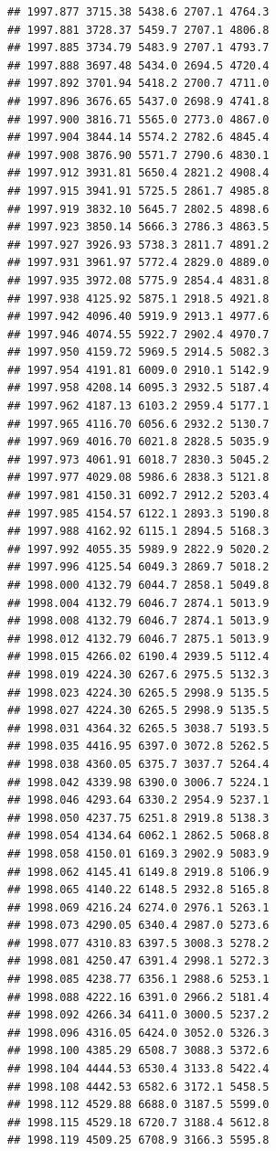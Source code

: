 \documentclass[
]{book}
\begin{document}
\begin{verbatim}
## 1997.877 3715.38 5438.6 2707.1 4764.3
## 1997.881 3728.37 5459.7 2707.1 4806.8
## 1997.885 3734.79 5483.9 2707.1 4793.7
## 1997.888 3697.48 5434.0 2694.5 4720.4
## 1997.892 3701.94 5418.2 2700.7 4711.0
## 1997.896 3676.65 5437.0 2698.9 4741.8
## 1997.900 3816.71 5565.0 2773.0 4867.0
## 1997.904 3844.14 5574.2 2782.6 4845.4
## 1997.908 3876.90 5571.7 2790.6 4830.1
## 1997.912 3931.81 5650.4 2821.2 4908.4
## 1997.915 3941.91 5725.5 2861.7 4985.8
## 1997.919 3832.10 5645.7 2802.5 4898.6
## 1997.923 3850.14 5666.3 2786.3 4863.5
## 1997.927 3926.93 5738.3 2811.7 4891.2
## 1997.931 3961.97 5772.4 2829.0 4889.0
## 1997.935 3972.08 5775.9 2854.4 4831.8
## 1997.938 4125.92 5875.1 2918.5 4921.8
## 1997.942 4096.40 5919.9 2913.1 4977.6
## 1997.946 4074.55 5922.7 2902.4 4970.7
## 1997.950 4159.72 5969.5 2914.5 5082.3
## 1997.954 4191.81 6009.0 2910.1 5142.9
## 1997.958 4208.14 6095.3 2932.5 5187.4
## 1997.962 4187.13 6103.2 2959.4 5177.1
## 1997.965 4116.70 6056.6 2932.2 5130.7
## 1997.969 4016.70 6021.8 2828.5 5035.9
## 1997.973 4061.91 6018.7 2830.3 5045.2
## 1997.977 4029.08 5986.6 2838.3 5121.8
## 1997.981 4150.31 6092.7 2912.2 5203.4
## 1997.985 4154.57 6122.1 2893.3 5190.8
## 1997.988 4162.92 6115.1 2894.5 5168.3
## 1997.992 4055.35 5989.9 2822.9 5020.2
## 1997.996 4125.54 6049.3 2869.7 5018.2
## 1998.000 4132.79 6044.7 2858.1 5049.8
## 1998.004 4132.79 6046.7 2874.1 5013.9
## 1998.008 4132.79 6046.7 2874.1 5013.9
## 1998.012 4132.79 6046.7 2875.1 5013.9
## 1998.015 4266.02 6190.4 2939.5 5112.4
## 1998.019 4224.30 6267.6 2975.5 5132.3
## 1998.023 4224.30 6265.5 2998.9 5135.5
## 1998.027 4224.30 6265.5 2998.9 5135.5
## 1998.031 4364.32 6265.5 3038.7 5193.5
## 1998.035 4416.95 6397.0 3072.8 5262.5
## 1998.038 4360.05 6375.7 3037.7 5264.4
## 1998.042 4339.98 6390.0 3006.7 5224.1
## 1998.046 4293.64 6330.2 2954.9 5237.1
## 1998.050 4237.75 6251.8 2919.8 5138.3
## 1998.054 4134.64 6062.1 2862.5 5068.8
## 1998.058 4150.01 6169.3 2902.9 5083.9
## 1998.062 4145.41 6149.8 2919.8 5106.9
## 1998.065 4140.22 6148.5 2932.8 5165.8
## 1998.069 4216.24 6274.0 2976.1 5263.1
## 1998.073 4290.05 6340.4 2987.0 5273.6
## 1998.077 4310.83 6397.5 3008.3 5278.2
## 1998.081 4250.47 6391.4 2998.1 5272.3
## 1998.085 4238.77 6356.1 2988.6 5253.1
## 1998.088 4222.16 6391.0 2966.2 5181.4
## 1998.092 4266.34 6411.0 3000.5 5237.2
## 1998.096 4316.05 6424.0 3052.0 5326.3
## 1998.100 4385.29 6508.7 3088.3 5372.6
## 1998.104 4444.53 6530.4 3133.8 5422.4
## 1998.108 4442.53 6582.6 3172.1 5458.5
## 1998.112 4529.88 6688.0 3187.5 5599.0
## 1998.115 4529.18 6720.7 3188.4 5612.8
## 1998.119 4509.25 6708.9 3166.3 5595.8

\end{verbatim}
\end{document}
